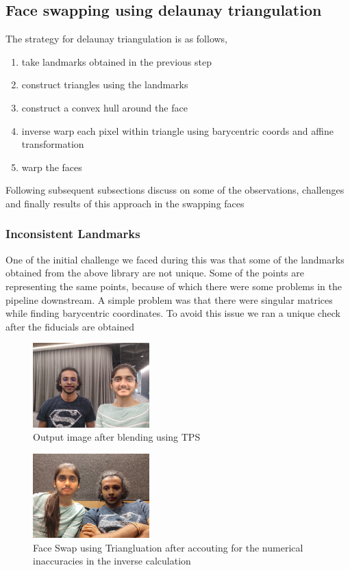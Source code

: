 \documentclass[conference]{IEEEtran}
\begin{document}
\subsection{Face swapping using delaunay triangulation}
The strategy for delaunay triangulation is as follows, 
\begin{enumerate}
    \item take landmarks obtained in the previous step
    \item construct triangles using the landmarks
    \item construct a convex hull around the face
    \item inverse warp each pixel within triangle using barycentric coords and affine transformation
    \item warp the faces
\end{enumerate}



Following subsequent subsections discuss on some of the observations, challenges and finally results of this approach in the swapping faces
\subsubsection{Inconsistent Landmarks}
One of the initial challenge we faced during this was that some of the landmarks obtained from the above library are not unique. Some of the points are representing the same points, because of which there were some problems in the pipeline downstream. A simple problem was that there were singular matrices while finding barycentric coordinates. To avoid this issue we ran a unique check after the fiducials are obtained 

\begin{figure}[]
\centering
\includegraphics[width=0.4\textwidth]{media/blend_after.png}
\caption{Output image after blending using TPS}
\label{fig:after_blending}
\end{figure}

\begin{figure}[]
    \centering
    \includegraphics[width=0.4\textwidth]{media/correct_triangulation.png}
    \caption{Face Swap using Triangluation after accouting for the numerical inaccuracies in the inverse calculation }
    \label{fig:barycentric_solution}
\end{figure}
\end{document}

